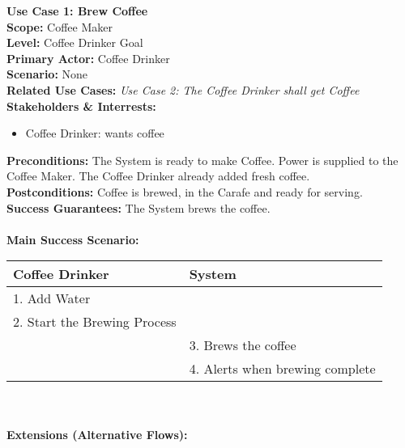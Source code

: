 \documentclass[letterpaper]{article}
\begin{document}
\noindent
\textbf{Use Case 1: Brew Coffee}\\
\textbf{Scope: }Coffee Maker\\
\textbf{Level: }Coffee Drinker Goal\\
\textbf{Primary Actor: }Coffee Drinker\\
\textbf{Scenario: }None\\
\textbf{Related Use Cases: }\textit{Use Case 2:  The Coffee Drinker
shall get Coffee}\\
\textbf{Stakeholders \& Interrests: }
\begin{itemize}
\item Coffee Drinker: wants coffee
\end{itemize}
\textbf{Preconditions: }The System is ready to make Coffee.  Power is
supplied to the Coffee Maker.  The Coffee Drinker already added fresh
coffee.\\
\textbf{Postconditions: }Coffee is brewed, in the Carafe and ready for
serving.\\
\textbf{Success Guarantees: }The System brews the coffee.\\\\
\textbf{Main Success Scenario: }\\
\begin{tabular}{|p{5.75cm}|p{5.75cm}|}\hline
\textbf{Coffee Drinker} & \textbf{System}\\\hline
1.  Add Water & \\\hline
2.  Start the Brewing Process &\\\hline
& 3. Brews the coffee\\\hline
& 4. Alerts when brewing complete\\\hline
\end{tabular}\\\\
\textbf{Extensions (Alternative Flows): }
\end{document}
